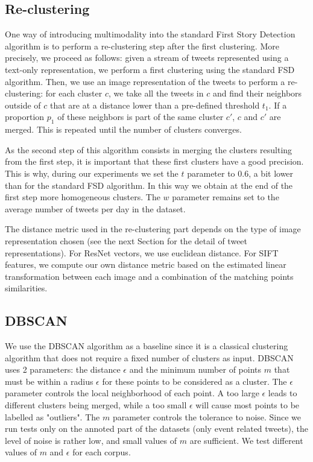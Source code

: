 \subsection{Re-clustering}
\label{SubSec: reclustering}
One way of introducing multimodality into the standard First Story Detection algorithm is to perform a re-clustering step after the first clustering. More precisely, we proceed as follows: given a stream of tweets represented using a text-only representation, we perform a first clustering using the standard FSD algorithm. Then, we use an image representation of the tweets to perform a re-clustering: for each cluster $c$, we take all the tweets in $c$ and find their neighbors outside of $c$ that are at a distance lower than a pre-defined threshold $t_1$. If a proportion $p_1$ of these neighbors is part of the same cluster $c'$, $c$ and $c'$ are merged. This is repeated until the number of clusters converges.

As the second step of this algorithm consists in merging the clusters resulting from the first step, it is important that these first clusters have a good precision. This is why, during our experiments we set the $t$ parameter to 0.6, a bit lower than for the standard FSD algorithm. In this way we obtain at the end of the first step more homogeneous clusters. The $w$ parameter remains set to the average number of tweets per day in the dataset.

The distance metric used in the re-clustering part depends on the type of image representation chosen (see the next Section for the detail of tweet representations). For ResNet vectors, we use euclidean distance. For SIFT features, we compute our own distance metric based on the estimated linear transformation between each image and a combination of the matching points similarities.

\subsection{DBSCAN}
We use the DBSCAN algorithm \cite{ester1996density} as a baseline since it is a classical clustering algorithm that does not require a fixed number of clusters as input. DBSCAN uses 2 parameters: the distance $\epsilon$ and the minimum number of points $m$ that must be within a radius $\epsilon$ for these points to be considered as a cluster. The $\epsilon$ parameter controls the local neighborhood of each point. A too large $\epsilon$ leads to different clusters being merged, while a too small $\epsilon$ will cause most points to be labelled as "outliers". The $m$ parameter controls the tolerance to noise. Since we run tests only on the annoted part of the datasets (only event related tweets), the level of noise is rather low, and small values of $m$ are sufficient. We test different values of $m$ and $\epsilon$ for each corpus.

